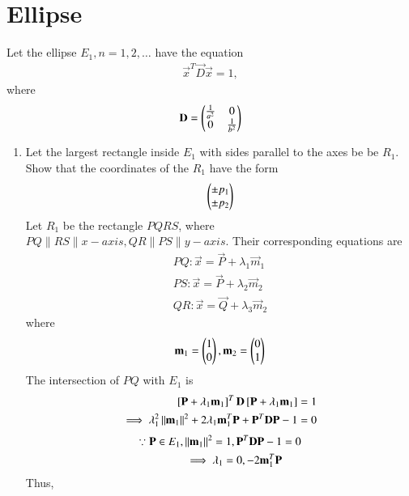 \documentclass[journal,12pt,twocolumn]{IEEEtran}
\renewcommand\thesection{\arabic{section}}
\begin{document}
\section{Ellipse}
Let the ellipse $E_1, n = 1, 2,  \dots$ have the equation 
\begin{align}
\vec{x}^T\vec{D}\vec{x} = 1,
\end{align}
%
where 
\begin{align}
\mathbf{D} = \begin{pmatrix}\frac{1}{a^2} & 0 \\ 0 & \frac{1}{b^2}\end{pmatrix} 
\end{align}
\begin{enumerate}[label=\thesection.\arabic*
,ref=\thesection.\theenumi]
\item Let the largest rectangle inside $E_1$  with sides parallel to the axes be be $R_1$.
Show that the coordinates of the $R_1$ have the form
\begin{align}
 \begin{pmatrix}\pm p_1 \\ \pm p_2\end{pmatrix}
\end{align}
\solution Let $R_1$ be the rectangle $PQRS$, where $PQ \parallel RS \parallel x-axis, QR \parallel PS \parallel y-axis $. Their corresponding equations are 
\begin{align}
\label{eq:9_pq}
PQ: \vec{x} = \vec{P} +  \lambda_1 \vec{m}_1
\\
\label{eq:9_ps}
PS: \vec{x} = \vec{P} +  \lambda_2 \vec{m}_2
\\
\label{eq:9_qr}
QR: \vec{x} = \vec{Q} +  \lambda_3 \vec{m}_2
\end{align}
%
where 
\begin{align}
\mathbf{m}_1=\begin{pmatrix}1\\  0\end{pmatrix},
\mathbf{m}_2=\begin{pmatrix}0\\  1\end{pmatrix}
\end{align}
The intersection of $PQ$ with $E_1$ is
\begin{align}
{}\left[\mathbf{P} +  \lambda_1 \mathbf{m}_1\right]^T\mathbf{D}{}\left[\mathbf{P} +  \lambda_1 \mathbf{m}_1\right] &= 1
\nonumber \\
\implies \lambda_1^2 \left\Vert\mathbf{m}_1\right\Vert^2 + 2\lambda_1 \mathbf{m}_1^T\mathbf{P}+\mathbf{P}^T\mathbf{D}\mathbf{P} -1 & = 0
\nonumber 
\end{align}
\begin{align}
\because \mathbf{P} \in E_1, \left\Vert\mathbf{m}_1\right\Vert^2  = 1, \mathbf{P}^T\mathbf{D}\mathbf{P} -1 &= 0
\nonumber \\
\implies \lambda_1 = 0, -2\mathbf{m}_1^T\mathbf{P}
\end{align}
%
Thus,
\begin{align}

\end{align}
\end{enumerate}
\end{document}

